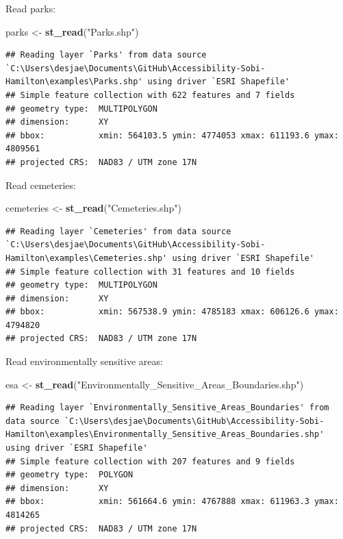 \documentclass[
]{article}
\newenvironment{Shaded}{\begin{snugshade}}{\end{snugshade}}
\newcommand{\KeywordTok}[1]{\textcolor[rgb]{0.13,0.29,0.53}{\textbf{#1}}}
\newcommand{\NormalTok}[1]{#1}
\newcommand{\StringTok}[1]{\textcolor[rgb]{0.31,0.60,0.02}{#1}}
\begin{document}
Read parks:

\begin{Shaded}
\begin{Highlighting}[]
\NormalTok{parks <-}\StringTok{ }\KeywordTok{st_read}\NormalTok{(}\StringTok{"Parks.shp"}\NormalTok{)}
\end{Highlighting}
\end{Shaded}

\begin{verbatim}
## Reading layer `Parks' from data source `C:\Users\desjae\Documents\GitHub\Accessibility-Sobi-Hamilton\examples\Parks.shp' using driver `ESRI Shapefile'
## Simple feature collection with 622 features and 7 fields
## geometry type:  MULTIPOLYGON
## dimension:      XY
## bbox:           xmin: 564103.5 ymin: 4774053 xmax: 611193.6 ymax: 4809561
## projected CRS:  NAD83 / UTM zone 17N
\end{verbatim}

Read cemeteries:

\begin{Shaded}
\begin{Highlighting}[]
\NormalTok{cemeteries <-}\StringTok{ }\KeywordTok{st_read}\NormalTok{(}\StringTok{"Cemeteries.shp"}\NormalTok{)}
\end{Highlighting}
\end{Shaded}

\begin{verbatim}
## Reading layer `Cemeteries' from data source `C:\Users\desjae\Documents\GitHub\Accessibility-Sobi-Hamilton\examples\Cemeteries.shp' using driver `ESRI Shapefile'
## Simple feature collection with 31 features and 10 fields
## geometry type:  MULTIPOLYGON
## dimension:      XY
## bbox:           xmin: 567538.9 ymin: 4785183 xmax: 606126.6 ymax: 4794820
## projected CRS:  NAD83 / UTM zone 17N
\end{verbatim}

Read environmentally sensitive areas:

\begin{Shaded}
\begin{Highlighting}[]
\NormalTok{esa <-}\StringTok{ }\KeywordTok{st_read}\NormalTok{(}\StringTok{"Environmentally_Sensitive_Areas_Boundaries.shp"}\NormalTok{)}
\end{Highlighting}
\end{Shaded}

\begin{verbatim}
## Reading layer `Environmentally_Sensitive_Areas_Boundaries' from data source `C:\Users\desjae\Documents\GitHub\Accessibility-Sobi-Hamilton\examples\Environmentally_Sensitive_Areas_Boundaries.shp' using driver `ESRI Shapefile'
## Simple feature collection with 207 features and 9 fields
## geometry type:  POLYGON
## dimension:      XY
## bbox:           xmin: 561664.6 ymin: 4767888 xmax: 611963.3 ymax: 4814265
## projected CRS:  NAD83 / UTM zone 17N
\end{verbatim}
\end{document}

